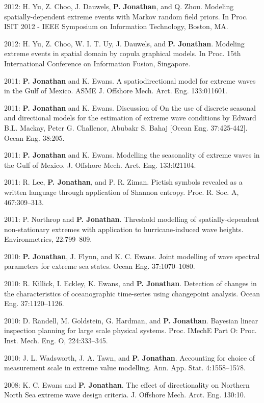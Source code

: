 \documentclass[11pt,a4paper]{moderncv}
\begin{document}
2012: H. Yu, Z. Choo, J. Dauwels, \textbf{P. Jonathan}, and Q. Zhou. Modeling spatially-dependent extreme events with Markov random field priors. In Proc. ISIT 2012 - IEEE Symposium on Information Technology, Boston, MA.

2012: H. Yu, Z. Choo, W. I. T. Uy, J. Dauwels, and \textbf{P. Jonathan}. Modeling extreme events in spatial domain by copula graphical models. In Proc. 15th International Conference on Information Fusion, Singapore.

2011: \textbf{P. Jonathan} and K. Ewans. A spatiodirectional model for extreme waves in the Gulf of Mexico. ASME J. Offshore Mech. Arct. Eng. 133:011601.

2011: \textbf{P. Jonathan} and K. Ewans. Discussion of On the use of discrete seasonal and directional models for the estimation of extreme wave conditions by Edward B.L. Mackay, Peter G. Challenor, Abubakr S. Bahaj [Ocean Eng. 37:425-442]. Ocean Eng. 38:205.

2011: \textbf{P. Jonathan} and K. Ewans. Modelling the seasonality of extreme waves in the Gulf of Mexico. J. Offshore Mech. Arct. Eng. 133:021104.

2011: R. Lee, \textbf{P. Jonathan}, and P. R. Ziman. Pictish symbols revealed as a written language through application of Shannon entropy. Proc. R. Soc. A, 467:309--313.

2011: P. Northrop and \textbf{P. Jonathan}. Threshold modelling of spatially-dependent non-stationary extremes with application to hurricane-induced wave heights. Environmetrics, 22:799--809.

2010: \textbf{P. Jonathan}, J. Flynn, and K. C. Ewans. Joint modelling of wave spectral parameters for extreme sea states. Ocean Eng. 37:1070--1080.

2010: R. Killick, I. Eckley, K. Ewans, and \textbf{P. Jonathan}. Detection of changes in the characteristics of oceanographic time-series using changepoint analysis. Ocean Eng. 37:1120--1126.

2010: D. Randell, M. Goldstein, G. Hardman, and \textbf{P. Jonathan}. Bayesian linear inspection planning for large scale physical systems. Proc. IMechE Part O: Proc. Inst. Mech. Eng. O, 224:333--345.

2010: J. L. Wadsworth, J. A. Tawn, and \textbf{P. Jonathan}. Accounting for choice of measurement scale in extreme value modelling. Ann. App. Stat. 4:1558--1578.

2008: K. C. Ewans and \textbf{P. Jonathan}. The effect of directionality on Northern North Sea extreme wave design criteria. J. Offshore Mech. Arct. Eng. 130:10.
\end{document}
